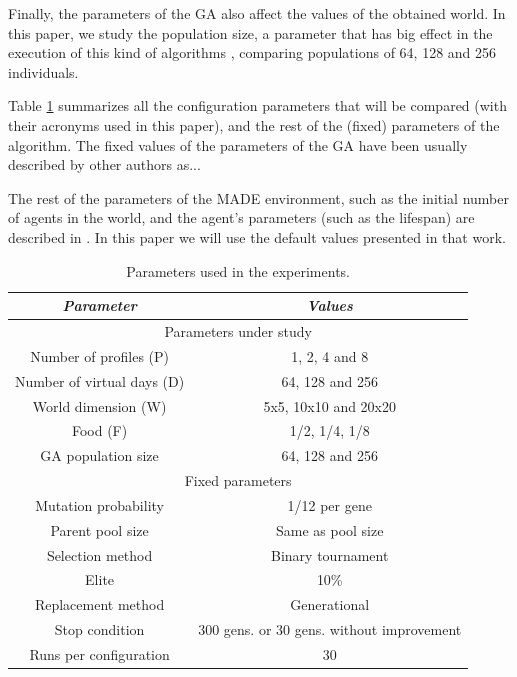 \documentclass[runningheads,a4paper]{llncs}
\begin{document}
Finally, the parameters of the GA also affect the values of the
obtained world. In this paper, we study the population size, a parameter that has big effect in the execution of this kind of algorithms \cite{}, comparing populations of 64, 128 and 256 individuals. %

Table \ref{tab:parameters} summarizes all the configuration parameters that will be compared (with their acronyms used in this paper), and the rest of the (fixed) parameters of the algorithm. The fixed values of the parameters of the GA have been usually described by other authors as...

The rest of the parameters of the MADE environment, such as the initial number of agents in the world, and the agent's parameters (such as the lifespan) are described in \cite{garcia14my}. In this paper we will use the default values presented in that work.

\begin{table}
\begin{center}
\begin{tabular}{|c|c|}
\hline
{\em Parameter} & {\em Values} \\\hline \hline
\multicolumn{2}{|c|}{Parameters under study} \\ \hline \hline
Number of profiles (P) & 1, 2, 4 and 8 \\\hline
Number of virtual days (D) &  64, 128 and 256 \\ \hline
World dimension (W) &  5x5, 10x10 and 20x20 \\ \hline
Food (F) & 1/2, 1/4, 1/8 \\ \hline
GA population size & 64, 128 and 256 \\ \hline
\multicolumn{2}{|c|}{Fixed parameters} \\ \hline \hline
Mutation probability & 1/12 per gene \\ \hline
Parent pool size & Same as pool size \\ \hline
Selection method & Binary tournament \\ \hline 
Elite & 10\%  \\ \hline
Replacement method & Generational\\ \hline
Stop condition & 300 gens. or 30 gens. without improvement \\ \hline
Runs per configuration & 30 \\ \hline
\end{tabular}
\caption{Parameters used in the experiments.}
\label{tab:parameters}
\end{center}
\end{table}
\end{document}
